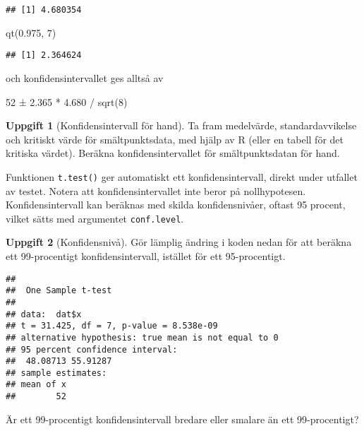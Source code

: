 \documentclass[
]{book}
\newenvironment{Shaded}{\begin{snugshade}}{\end{snugshade}}
\newcommand{\AttributeTok}[1]{\textcolor[rgb]{0.77,0.63,0.00}{#1}}
\newcommand{\DecValTok}[1]{\textcolor[rgb]{0.00,0.00,0.81}{#1}}
\newcommand{\FloatTok}[1]{\textcolor[rgb]{0.00,0.00,0.81}{#1}}
\newcommand{\FunctionTok}[1]{\textcolor[rgb]{0.00,0.00,0.00}{#1}}
\newcommand{\NormalTok}[1]{#1}
\newcommand{\SpecialCharTok}[1]{\textcolor[rgb]{0.00,0.00,0.00}{#1}}
\theoremstyle{definition}
\theoremstyle{definition}
\theoremstyle{definition}
\newtheorem{exercise}{Uppgift}[chapter]
\theoremstyle{definition}
\theoremstyle{remark}
\begin{document}
\begin{verbatim}
## [1] 4.680354
\end{verbatim}

\begin{Shaded}
\begin{Highlighting}[]
\FunctionTok{qt}\NormalTok{(}\FloatTok{0.975}\NormalTok{, }\DecValTok{7}\NormalTok{)}
\end{Highlighting}
\end{Shaded}

\begin{verbatim}
## [1] 2.364624
\end{verbatim}

och konfidensintervallet ges alltså av

52 ± 2.365 * 4.680 / sqrt(8)

\begin{exercise}[Konfidensintervall för hand]
Ta fram medelvärde, standardavvikelse och kritiskt värde för smältpunktsdata, med hjälp av R (eller en tabell för det kritiska värdet). Beräkna konfidensintervallet för smältpunktsdatan för hand.
\end{exercise}

Funktionen \texttt{t.test()} ger automatiskt ett konfidensintervall, direkt under utfallet av testet. Notera att konfidensintervallet inte beror på nollhypotesen. Konfidensintervall kan beräknas med skilda konfidensnivåer, oftast 95 procent, vilket sätts med argumentet \texttt{conf.level}.

\begin{exercise}[Konfidensnivå]
Gör lämplig ändring i koden nedan för att beräkna ett 99-procentigt konfidensintervall, istället för ett 95-procentigt.

\begin{Shaded}
\end{Shaded}

\begin{verbatim}
## 
##  One Sample t-test
## 
## data:  dat$x
## t = 31.425, df = 7, p-value = 8.538e-09
## alternative hypothesis: true mean is not equal to 0
## 95 percent confidence interval:
##  48.08713 55.91287
## sample estimates:
## mean of x 
##        52
\end{verbatim}

Är ett 99-procentigt konfidensintervall bredare eller smalare än ett 99-procentigt?
\end{exercise}
\end{document}
